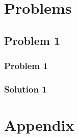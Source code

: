 \documentclass{book}
\begin{document}
	\chapter{Problems}
	\section{Problem 1}
	\subsection{Problem 1}
	\lipsum[1]  %
	\subsection{Solution 1}
	\lipsum[1-7] %
	\cleardoublepage
	
	\appendix
	\chapter{Appendix \thechapter}
	\lipsum[1-20]
	
\end{document}
